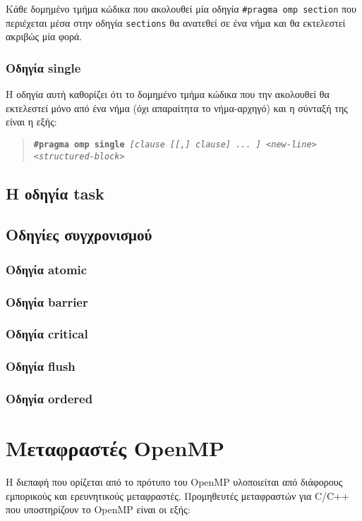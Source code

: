 Κάθε δομημένο τμήμα κώδικα που ακολουθεί μία οδηγία \texttt{\#pragma omp section} που περιέχεται μέσα στην οδηγία \texttt{sections} θα ανατεθεί σε ένα νήμα και θα εκτελεστεί ακριβώς μία φορά.

\subsubsection{Οδηγία single}
Η οδηγία αυτή καθορίζει ότι το δομημένο τμήμα κώδικα που την ακολουθεί θα εκτελεστεί μόνο από ένα νήμα (όχι απαραίτητα το νήμα-αρχηγό) και η σύνταξή της είναι η εξής:
\begin{quote}
	\texttt{\textbf{\#pragma omp single} \textit{[clause [[,] clause] ... ] <new-line>}} \\
		\texttt{\textit{<structured-block>}}
\end{quote}


\subsection{Η οδηγία task}

\subsection{Οδηγίες συγχρονισμού}

\subsubsection{Οδηγία atomic}

\subsubsection{Οδηγία barrier}

\subsubsection{Οδηγία critical}

\subsubsection{Οδηγία flush}

\subsubsection{Οδηγία ordered}


\section{Μεταφραστές OpenMP}
Η διεπαφή που ορίζεται από το πρότυπο του OpenMP υλοποιείται από διάφορους εμπορικούς και ερευνητικούς μεταφραστές. Προμηθευτές μεταφραστών για C/C++ που υποστηρίζουν το OpenMP είναι οι εξής:

